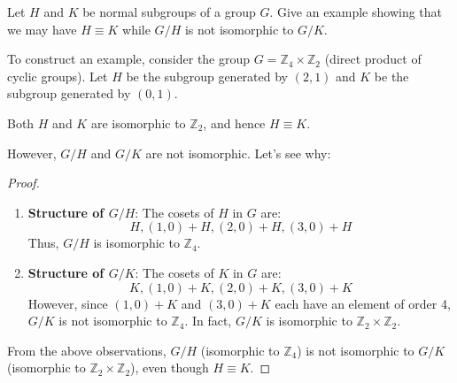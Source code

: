 \documentclass[12pt]{amsart}
\theoremstyle{definition}
\numberwithin{equation}{section}
\theoremstyle{plain}
\newcommand{\Z}{\mathbb{Z}}
\begin{document}
\begin{exercise}{29} Let $H$ and $K$ be normal subgroups of a group $G$. Give an example showing that we may have $H \equiv K$ while $G/H$ is not isomorphic to $G/K$.
    
    To construct an example, consider the group \( G = \Z_4 \times \Z_2 \) (direct product of cyclic groups). Let \( H \) be the subgroup generated by \( (2,1) \) and \( K \) be the subgroup generated by \( (0,1) \). 

    Both \( H \) and \( K \) are isomorphic to \( \Z_2 \), and hence \( H \equiv K \). 
    
    However, \( G/H \) and \( G/K \) are not isomorphic. Let's see why:
    
    \begin{proof} $ $\\
    
    \begin{enumerate}
        \item \textbf{Structure of \( G/H \)}:
           The cosets of \( H \) in \( G \) are:
           \[ H, (1,0) + H, (2,0) + H, (3,0) + H \]
           Thus, \( G/H \) is isomorphic to \( \Z_4 \).
        
        \item \textbf{Structure of \( G/K \)}:
           The cosets of \( K \) in \( G \) are:
           \[ K, (1,0) + K, (2,0) + K, (3,0) + K \]
           However, since \( (1,0) + K \) and \( (3,0) + K \) each have an element of order 4, \( G/K \) is not isomorphic to \( \Z_4 \). In fact, \( G/K \) is isomorphic to \( \Z_2 \times \Z_2 \).
    \end{enumerate}
    
    From the above observations, \( G/H \) (isomorphic to \( \Z_4 \)) is not isomorphic to \( G/K \) (isomorphic to \( \Z_2 \times \Z_2 \)), even though \( H \equiv K \).
    
    \end{proof}
\end{exercise}
\vspace*{20pt}
\end{document}
